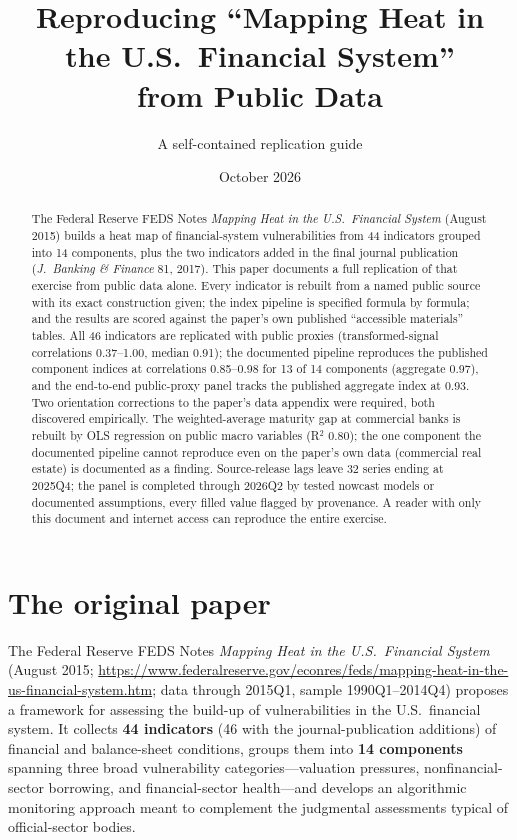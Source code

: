 \documentclass[11pt]{article}
\title{Reproducing ``Mapping Heat in the U.S.\ Financial System''\\ from Public Data}
\author{A self-contained replication guide}
\date{October 2026}
\begin{document}
\maketitle

\begin{abstract}
The Federal Reserve FEDS Notes \textit{Mapping Heat in the U.S.\ Financial
System} (August 2015) builds a heat map of financial-system vulnerabilities
from 44 indicators grouped into 14 components, plus the two indicators added in
the final journal publication (\textit{J.~Banking \& Finance} 81, 2017).  This paper documents a full
replication of that exercise from public data alone.  Every indicator is
rebuilt from a named public source with its exact construction given; the
index pipeline is specified formula by formula; and the results are scored
against the paper's own published ``accessible materials'' tables.
All 46 indicators are replicated with public proxies (transformed-signal
correlations 0.37--1.00, median 0.91); the documented pipeline
reproduces the published component indices at correlations 0.85--0.98 for
13 of 14 components (aggregate 0.97), and the end-to-end public-proxy panel
tracks the published aggregate index at 0.93.  Two orientation corrections
to the paper's data appendix were required, both discovered empirically.
The weighted-average maturity gap at commercial banks is rebuilt by OLS
regression on public macro variables (R$^2$ 0.80); the one component the documented
pipeline cannot reproduce even on the paper's own data (commercial real
estate) is documented as a finding.  Source-release lags leave 32 series
ending at 2025Q4; the panel is completed through 2026Q2 by tested nowcast
models or documented assumptions, every filled value flagged by provenance.
A reader with only this document and
internet access can reproduce the entire exercise.
\end{abstract}

\tableofcontents
\newpage

\section{The original paper}
\label{sec:original}

The Federal Reserve FEDS Notes \textit{Mapping Heat in the U.S.\ Financial
System} (August 2015;
\url{https://www.federalreserve.gov/econres/feds/mapping-heat-in-the-us-financial-system.htm};
data through 2015Q1, sample 1990Q1--2014Q4) proposes
a framework for assessing the build-up of vulnerabilities in the U.S.\
financial system.  It collects \textbf{44 indicators} (46 with the journal-publication additions) of financial and
balance-sheet conditions, groups them into \textbf{14 components}
spanning three broad vulnerability categories---valuation pressures,
nonfinancial-sector borrowing, and financial-sector health---and develops
an algorithmic monitoring approach meant to complement the judgmental
assessments typical of official-sector bodies.
\end{document}
